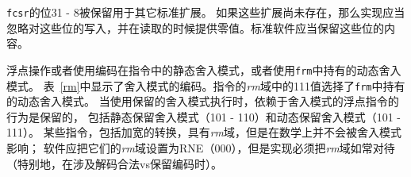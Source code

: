 {\tt fcsr}的位31 - 8被保留用于其它标准扩展。
如果这些扩展尚未存在，那么实现应当忽略对这些位的写入，并在读取的时候提供零值。标准软件应当保留这些位的内容。

浮点操作或者使用编码在指令中的静态舍入模式，或者使用{\tt frm}中持有的动态舍入模式。
表~\ref{rm}中显示了舍入模式的编码。指令的{\em rm}域中的111值选择了{\tt frm}中持有的动态舍入模式。
当使用保留的舍入模式执行时，依赖于舍入模式的浮点指令的行为是保留的，
包括静态保留舍入模式（101 - 110）和动态保留舍入模式（101 - 111）。
某些指令，包括加宽的转换，具有{\em rm}域，但是在数学上并不会被舍入模式影响；
软件应把它们的{\em rm}域设置为RNE（000），但是实现必须把{\em rm}域如常对待（特别地，在涉及解码合法vs保留编码时）。

